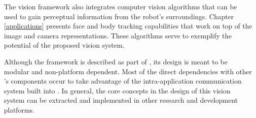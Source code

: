 The vision framework also integrates computer vision algorithms that can be used to gain perceptual 
information from the robot's surroundings. Chapter \ref{applications} presents face and body tracking 
capabilities that work on top of the image and camera representations. These algorithms serve to exemplify
the potential of the proposed vision system.

Although the framework is described as part of \RD{}, its design is meant to be modular and non-platform 
dependent. Most of the direct dependencies with other \RD{}'s components occur to take advantage of the 
intra-application communication system built into \RD{}. In general, the core concepts in the design of this vision 
system can be extracted and implemented in other research and development platforms. 